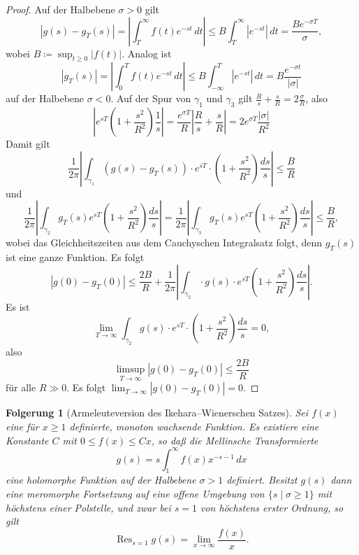 \documentclass[a4paper,twoside,openright]{report}
\newtheorem{cor}[thm]{Folgerung}
\theoremstyle{definition}
\theoremstyle{remark}
\DeclareMathOperator{\Res}{Res}
\begin{document}
\begin{proof}
  Auf der Halbebene $\sigma > 0$ gilt
  \[
    |g(s) - g_T(s)| = \left|\int_T^\infty f(t) e^{-st} \, dt\right|
    \leq B \int_T^\infty |e^{-st}| \, dt = \frac {B e^{-\sigma T}} \sigma,
  \]
  wobei $B \coloneqq \sup_{t \ge 0} |f(t)|$.
  Analog ist
  \[
    |g_T(s)| = \left| \int_0^T f(t) e^{-st} \, dt\right| \leq B \int_{-\infty}^T |e^{-st}| \, dt
    = B \frac{e^{-\sigma t}} {|\sigma|}
  \]
  auf der Halbebene $\sigma < 0$.
  Auf der Spur von $\gamma_1$ und $\gamma_3$ gilt $\frac R s + \frac s R =
  2 \frac \sigma R$, also
  \[
    \left|e^{sT} \left(1 + \frac {s^2}{R^2}\right) \frac 1 s\right|
    = \frac{e^{\sigma T}} R \left|\frac R s + \frac s R\right|
    = 2 e^{\sigma T} \frac{|\sigma|} {R^2}
  \]
  Damit gilt
  \[
    \frac 1 {2\pi} \left|
        \int_{\gamma_1} (g(s) - g_T(s)) \cdot e^{sT} \cdot \left(1 + \frac {s^2}{R^2}\right) \frac {ds}{s}\right|
    \leq \frac B R
  \]
  und
  \[
    \frac 1 {2\pi} \left|
    \int_{\gamma_2} g_T(s) e^{sT} \left(1 + \frac {s^2}{R^2}\right) \frac {ds}{s}\right|
    = \frac 1 {2\pi} \left|
    \int_{\gamma_3} g_T(s) e^{sT} \left(1 + \frac {s^2}{R^2}\right) \frac {ds}{s}\right|
    \leq \frac B R,
  \]
  wobei das Gleichheitszeiten aus dem Cauchyschen Integralsatz folgt, denn $g_T(s)$ ist
  eine ganze Funktion.
  Es folgt
  \[
    |g(0) - g_T(0)| \leq \frac{2 B}{R} +
      \frac 1 {2\pi} \left|
      \int_{\gamma_2} \cdot g(s) \cdot e^{sT} \left(1 + \frac {s^2}{R^2}\right) \frac {ds}{s}\right|.
  \]
  Es ist
  \[
    \lim_{T \to \infty} \int_{\gamma_2} g(s) \cdot e^{sT} \cdot \left(1 + \frac {s^2}{R^2}\right) \frac {ds}{s} = 0,
  \]
  also
  \[
    \limsup_{T \to \infty} |g(0) - g_T(0)| \leq \frac {2 B} R
  \]
  für alle $R \gg 0$.
  Es folgt $\lim_{T \to \infty} |g(0) - g_T(0)| = 0$. 
\end{proof}

\begin{cor}[Armeleuteversion des Ikehara--Wienerschen Satzes] 
  \label{cor:wiener}
  Sei $f(x)$ eine für $x \ge 1$ definierte, monoton wachsende Funktion.
  Es existiere eine Konstante $C$ mit $0 \leq f(x) \leq C x$, so daß
  die \emph{Mellinsche Transformierte} 
  \[
    g(s) = s \int_1^\infty f(x) x^{-s - 1} \, dx
  \]
  eine holomorphe Funktion auf der Halbebene $\sigma > 1$ definiert. Besitzt
  $g(s)$ dann eine meromorphe Fortsetzung auf eine offene Umgebung von
  $\{s \mid \sigma \ge 1\}$ mit
  höchstens einer Polstelle, und zwar bei $s = 1$ von höchstens erster Ordnung,
  so gilt
  \[
    \Res_{s = 1} g(s) = \lim_{x \to \infty} \frac{f(x)}{x}.
  \]
\end{cor}
\end{document}
